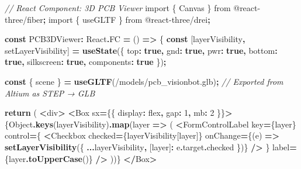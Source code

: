 \documentclass[
]{article}
\newenvironment{Shaded}{\begin{snugshade}}{\end{snugshade}}
\newcommand{\AttributeTok}[1]{\textcolor[rgb]{0.13,0.29,0.53}{#1}}
\newcommand{\BuiltInTok}[1]{#1}
\newcommand{\CommentTok}[1]{\textcolor[rgb]{0.56,0.35,0.01}{\textit{#1}}}
\newcommand{\ControlFlowTok}[1]{\textcolor[rgb]{0.13,0.29,0.53}{\textbf{#1}}}
\newcommand{\DecValTok}[1]{\textcolor[rgb]{0.00,0.00,0.81}{#1}}
\newcommand{\FunctionTok}[1]{\textcolor[rgb]{0.13,0.29,0.53}{\textbf{#1}}}
\newcommand{\ImportTok}[1]{#1}
\newcommand{\KeywordTok}[1]{\textcolor[rgb]{0.13,0.29,0.53}{\textbf{#1}}}
\newcommand{\NormalTok}[1]{#1}
\newcommand{\OperatorTok}[1]{\textcolor[rgb]{0.81,0.36,0.00}{\textbf{#1}}}
\newcommand{\StringTok}[1]{\textcolor[rgb]{0.31,0.60,0.02}{#1}}
\begin{document}
\begin{Shaded}
\begin{Highlighting}[]
\CommentTok{// React Component: 3D PCB Viewer}
\ImportTok{import}\NormalTok{ \{ Canvas \} }\ImportTok{from} \StringTok{\textquotesingle{}@react{-}three/fiber\textquotesingle{}}\OperatorTok{;}
\ImportTok{import}\NormalTok{ \{ useGLTF \} }\ImportTok{from} \StringTok{\textquotesingle{}@react{-}three/drei\textquotesingle{}}\OperatorTok{;}

\KeywordTok{const}\NormalTok{ PCB3DViewer}\OperatorTok{:}\NormalTok{ React}\OperatorTok{.}\AttributeTok{FC} \OperatorTok{=}\NormalTok{ () }\KeywordTok{=\textgreater{}}\NormalTok{ \{}
  \KeywordTok{const}\NormalTok{ [layerVisibility}\OperatorTok{,}\NormalTok{ setLayerVisibility] }\OperatorTok{=} \FunctionTok{useState}\NormalTok{(\{}
\NormalTok{    top}\OperatorTok{:} \KeywordTok{true}\OperatorTok{,}
\NormalTok{    gnd}\OperatorTok{:} \KeywordTok{true}\OperatorTok{,}
\NormalTok{    pwr}\OperatorTok{:} \KeywordTok{true}\OperatorTok{,}
\NormalTok{    bottom}\OperatorTok{:} \KeywordTok{true}\OperatorTok{,}
\NormalTok{    silkscreen}\OperatorTok{:} \KeywordTok{true}\OperatorTok{,}
\NormalTok{    components}\OperatorTok{:} \KeywordTok{true}
\NormalTok{  \})}\OperatorTok{;}

  \KeywordTok{const}\NormalTok{ \{ scene \} }\OperatorTok{=} \FunctionTok{useGLTF}\NormalTok{(}\StringTok{\textquotesingle{}/models/pcb\_visionbot.glb\textquotesingle{}}\NormalTok{)}\OperatorTok{;}  \CommentTok{// Exported from Altium as STEP → GLB}

  \ControlFlowTok{return}\NormalTok{ (}
    \OperatorTok{\textless{}}\NormalTok{div}\OperatorTok{\textgreater{}}
      \OperatorTok{\textless{}}\NormalTok{Box sx}\OperatorTok{=}\NormalTok{\{\{ display}\OperatorTok{:} \StringTok{\textquotesingle{}flex\textquotesingle{}}\OperatorTok{,}\NormalTok{ gap}\OperatorTok{:} \DecValTok{1}\OperatorTok{,}\NormalTok{ mb}\OperatorTok{:} \DecValTok{2}\NormalTok{ \}\}}\OperatorTok{\textgreater{}}
\NormalTok{        \{}\BuiltInTok{Object}\OperatorTok{.}\FunctionTok{keys}\NormalTok{(layerVisibility)}\OperatorTok{.}\FunctionTok{map}\NormalTok{(layer }\KeywordTok{=\textgreater{}}\NormalTok{ (}
          \OperatorTok{\textless{}}\NormalTok{FormControlLabel}
\NormalTok{            key}\OperatorTok{=}\NormalTok{\{layer\}}
\NormalTok{            control}\OperatorTok{=}\NormalTok{\{}
              \OperatorTok{\textless{}}\NormalTok{Checkbox}
\NormalTok{                checked}\OperatorTok{=}\NormalTok{\{layerVisibility[layer]\}}
\NormalTok{                onChange}\OperatorTok{=}\NormalTok{\{(e) }\KeywordTok{=\textgreater{}} \FunctionTok{setLayerVisibility}\NormalTok{(\{}
                  \OperatorTok{...}\NormalTok{layerVisibility}\OperatorTok{,}
\NormalTok{                  [layer]}\OperatorTok{:}\NormalTok{ e}\OperatorTok{.}\AttributeTok{target}\OperatorTok{.}\AttributeTok{checked}
\NormalTok{                \})\}}
              \OperatorTok{/\textgreater{}}
\NormalTok{            \}}
\NormalTok{            label}\OperatorTok{=}\NormalTok{\{layer}\OperatorTok{.}\FunctionTok{toUpperCase}\NormalTok{()\}}
          \OperatorTok{/\textgreater{}}
\NormalTok{        ))\}}
      \OperatorTok{\textless{}/}\NormalTok{Box}\OperatorTok{\textgreater{}}


\end{Highlighting}
\end{Shaded}
\end{document}
